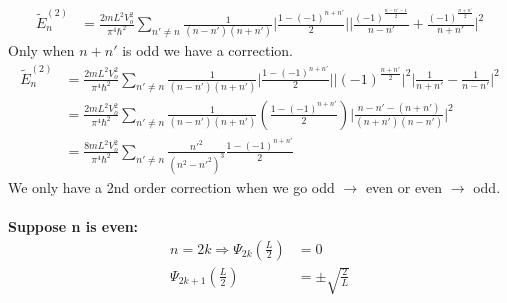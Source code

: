 \documentclass[12pt,fancychapters]{report}
\numberwithin{equation}{section}
\begin{document}
\begin{align*}
	\tilde{E}^{(2)}_n & = \frac{2mL^2V_o^2}{\pi^4 \hbar^2}\sum_{n'\neq n}\frac{1}{(n-n')(n+n')}\bigg|
	\frac{1-(-1)^{n+n'}}{2} \bigg|\bigg|\frac{(-1)^{\frac{n-n'-1}{2}}}{n-n'} + \frac{(-1)^{\frac{n+n'}
{2}}}{n+n'} \bigg|^2
\end{align*}
Only when $n+n'$ is odd we have a correction.
\begin{align*}
	\tilde{E}^{(2)}_n & = \frac{2mL^2V_o^2}{\pi^4 \hbar^2}\sum_{n'\neq n}\frac{1}{(n-n')(n+n')}\bigg|
	\frac{1-(-1)^{n+n'}}{2} \bigg|\bigg|(-1)^{\frac{n+n'}{2}}\bigg|^2\bigg|\frac{1}{n+n'} - 
	\frac{1}{n-n'}\bigg|^2\\
	& =\frac{2mL^2V_o^2}{\pi^4 \hbar^2}\sum_{n'\neq n}\frac{1}{(n-n')(n+n')}\left(
	\frac{1-(-1)^{n+n'}}{2}\right) \Bigg|\frac{n-n'-(n+n')}{(n+n')(n-n')}\Bigg|^2\\
	& = \frac{8mL^2V_o^2}{\pi^4 \hbar^2}\sum_{n'\neq n} \frac{n'^2}{(n^2 - n'^2)^3}\frac{1-(-1)^{n+n'}
	}{2}
\end{align*}
We only have a 2nd order correction when we go odd $\rightarrow$ even or even $\rightarrow$ odd.\\
\\
\textbf{Suppose n is even:}\\
\begin{align*}
	n = 2k \Longrightarrow \Psi_{2k}\left(\frac{L}{2}\right) & = 0\\
	\Psi_{2k + 1} \left(\frac{L}{2}\right) & = \pm \sqrt{\frac{2}{L}}
\end{align*}
\end{document}
